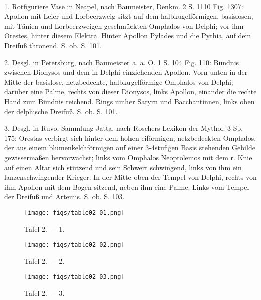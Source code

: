\documentclass[a4paper, 11pt, oneside]{article}
\begin{document}
\paragraph{}
1. Rotfiguriere Vase in Neapel, nach Baumeister, Denkm. 2 S. 1110 Fig. 1307: Apollon mit Leier und Lorbeerzweig sitzt auf dem halbkugelförmigen, basislosen, mit Tänien und Lorbeerzweigen geschmückten Omphalos von Delphi; vor ihm Orestes, hinter diesem Elektra. Hinter Apollon Pylades und die Pythia, auf dem Dreifuß thronend. S. ob. S. 101.

2. Desgl. in Petersburg, nach Baumeister a. a. O. 1 S. 104 Fig. 110: Bündnis zwischen Dionysos und dem in Delphi einziehenden Apollon. Vorn unten in der Mitte der basislose, netzbedeckte, halbkugelförmige Omphalos von Delphi; darüber eine Palme, rechts von dieser Dionysos, links Apollon, einander die rechte Hand zum Bündnis reichend. Rings umher Satyrn und Bacchantinnen, links oben der delphische Dreifuß. S. ob. S. 101.

3. Desgl. in Ruvo, Sammlung Jatta, nach Roschers Lexikon der Mythol. 3 Sp. 175: Orestas verbirgt sich hinter dem hohen eiförmigen, netzbedeckten Omphalos, der aus einem blumenkelchförmigen auf einer 3-4stufigen Basis stehenden Gebilde gewissermaßen hervorwächst; links vom Omphalos Neoptolemos mit dem r. Knie auf einen Altar sich stützend und sein Schwert schwingend, links von ihm ein lanzenschwingender Krieger. In der Mitte oben der Tempel von Delphi, rechts von ihm Apollon mit dem Bogen sitzend, neben ihm eine Palme. Links vom Tempel der Dreifuß und Artemis. S. ob. S. 103.
\clearpage
\begin{landscape}
\vspace*{\fill}
\begin{figure}[H]
\centering
\texttt{[image: figs/table02-01.png]}
\caption{Tafel 2. --- 1.}
\end{figure}
\vspace*{\fill}
\clearpage
\vspace*{\fill}
\begin{figure}[H]
\centering
\texttt{[image: figs/table02-02.png]}
\caption{Tafel 2. --- 2.}
\end{figure}
\vspace*{\fill}
\clearpage
\vspace*{\fill}
\begin{figure}[H]
\centering
\texttt{[image: figs/table02-03.png]}
\caption{Tafel 2. --- 3.}
\end{figure}
\vspace*{\fill}
\clearpage
\end{landscape}
\end{document}
